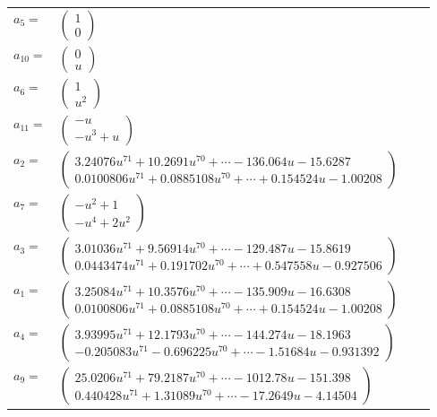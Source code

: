 \documentclass[1p]{elsarticle_modified}
\theoremstyle{definition}
\begin{document}
\begin{tabular}{m{7pt} m{180pt} m{7pt} m{180pt} }
\flushright $a_{5}=$&$\begin{pmatrix}1\\0\end{pmatrix}$ \\
\flushright $a_{10}=$&$\begin{pmatrix}0\\u\end{pmatrix}$ \\
\flushright $a_{6}=$&$\begin{pmatrix}1\\u^2\end{pmatrix}$ \\
\flushright $a_{11}=$&$\begin{pmatrix}- u\\- u^3+u\end{pmatrix}$ \\
\flushright $a_{2}=$&$\begin{pmatrix}3.24076 u^{71}+10.2691 u^{70}+\cdots-136.064 u-15.6287\\0.0100806 u^{71}+0.0885108 u^{70}+\cdots+0.154524 u-1.00208\end{pmatrix}$ \\
\flushright $a_{7}=$&$\begin{pmatrix}- u^2+1\\- u^4+2 u^2\end{pmatrix}$ \\
\flushright $a_{3}=$&$\begin{pmatrix}3.01036 u^{71}+9.56914 u^{70}+\cdots-129.487 u-15.8619\\0.0443474 u^{71}+0.191702 u^{70}+\cdots+0.547558 u-0.927506\end{pmatrix}$ \\
\flushright $a_{1}=$&$\begin{pmatrix}3.25084 u^{71}+10.3576 u^{70}+\cdots-135.909 u-16.6308\\0.0100806 u^{71}+0.0885108 u^{70}+\cdots+0.154524 u-1.00208\end{pmatrix}$ \\
\flushright $a_{4}=$&$\begin{pmatrix}3.93995 u^{71}+12.1793 u^{70}+\cdots-144.274 u-18.1963\\-0.205083 u^{71}-0.696225 u^{70}+\cdots-1.51684 u-0.931392\end{pmatrix}$ \\
\flushright $a_{9}=$&$\begin{pmatrix}25.0206 u^{71}+79.2187 u^{70}+\cdots-1012.78 u-151.398\\0.440428 u^{71}+1.31089 u^{70}+\cdots-17.2649 u-4.14504\end{pmatrix}$ \\

\end{tabular}
\end{document}

